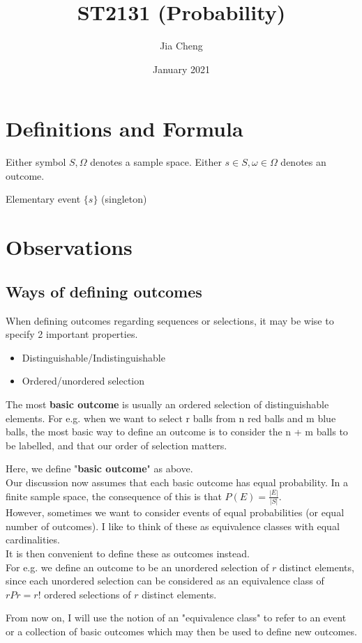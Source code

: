 \documentclass{article}
\title{ST2131 (Probability)}
\author{Jia Cheng}
\date{January 2021}
\begin{document}
\maketitle

\section{Definitions and Formula}
Either symbol $S, \Omega$ denotes a sample space.
Either $s\in S, \omega\in \Omega$ denotes an outcome.

Elementary event $\{s\}$ (singleton)

\section{Observations}
\subsection{Ways of defining outcomes}
When defining outcomes regarding sequences or selections, it may be wise to specify 2 important properties.
\begin{itemize}
	\item Distinguishable/Indistinguishable
	\item Ordered/unordered selection
\end{itemize}
The most \textbf{basic outcome} is usually an ordered selection of distinguishable elements. For e.g. when we want to select r balls from n red balls and m blue balls, the most basic way to define an outcome is to consider the n + m balls to be labelled, and that our order of selection matters.

Here, we define "\textbf{basic outcome}" as above.\\
Our discussion now assumes that each basic outcome has equal probability. In a finite sample space, the consequence of this is that $P(E)=\frac{|E|}{|S|}$.\\
However, sometimes we want to consider events of equal probabilities (or equal number of outcomes). I like to think of these as equivalence classes with equal cardinalities.\\
It is then convenient to define these as outcomes instead.\\
For e.g. we define an outcome to be an unordered selection of $r$ distinct elements, since each unordered selection can be considered as an equivalence class of $rPr=r!$ ordered selections of $r$ distinct elements.

From now on, I will use the notion of an "equivalence class" to refer to an event or a collection of basic outcomes which may then be used to define new outcomes.
\end{document}
